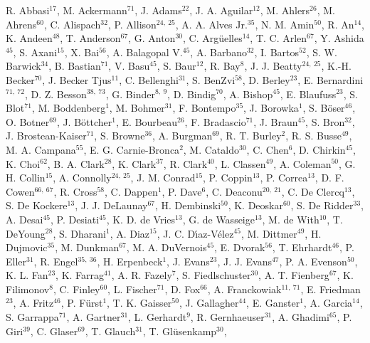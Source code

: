 \documentclass[a4paper,11pt]{article}
\begin{document}
\scriptsize
\noindent
R. Abbasi$^{17}$,
M. Ackermann$^{71}$,
J. Adams$^{22}$,
J. A. Aguilar$^{12}$,
M. Ahlers$^{26}$,
M. Ahrens$^{60}$,
C. Alispach$^{32}$,
P. Allison$^{24,\: 25}$,
A. A. Alves Jr.$^{35}$,
N. M. Amin$^{50}$,
R. An$^{14}$,
K. Andeen$^{48}$,
T. Anderson$^{67}$,
G. Anton$^{30}$,
C. Arg{\"u}elles$^{14}$,
T. C. Arlen$^{67}$,
Y. Ashida$^{45}$,
S. Axani$^{15}$,
X. Bai$^{56}$,
A. Balagopal V.$^{45}$,
A. Barbano$^{32}$,
I. Bartos$^{52}$,
S. W. Barwick$^{34}$,
B. Bastian$^{71}$,
V. Basu$^{45}$,
S. Baur$^{12}$,
R. Bay$^{8}$,
J. J. Beatty$^{24,\: 25}$,
K.-H. Becker$^{70}$,
J. Becker Tjus$^{11}$,
C. Bellenghi$^{31}$,
S. BenZvi$^{58}$,
D. Berley$^{23}$,
E. Bernardini$^{71,\: 72}$,
D. Z. Besson$^{38,\: 73}$,
G. Binder$^{8,\: 9}$,
D. Bindig$^{70}$,
A. Bishop$^{45}$,
E. Blaufuss$^{23}$,
S. Blot$^{71}$,
M. Boddenberg$^{1}$,
M. Bohmer$^{31}$,
F. Bontempo$^{35}$,
J. Borowka$^{1}$,
S. B{\"o}ser$^{46}$,
O. Botner$^{69}$,
J. B{\"o}ttcher$^{1}$,
E. Bourbeau$^{26}$,
F. Bradascio$^{71}$,
J. Braun$^{45}$,
S. Bron$^{32}$,
J. Brostean-Kaiser$^{71}$,
S. Browne$^{36}$,
A. Burgman$^{69}$,
R. T. Burley$^{2}$,
R. S. Busse$^{49}$,
M. A. Campana$^{55}$,
E. G. Carnie-Bronca$^{2}$,
M. Cataldo$^{30}$,
C. Chen$^{6}$,
D. Chirkin$^{45}$,
K. Choi$^{62}$,
B. A. Clark$^{28}$,
K. Clark$^{37}$,
R. Clark$^{40}$,
L. Classen$^{49}$,
A. Coleman$^{50}$,
G. H. Collin$^{15}$,
A. Connolly$^{24,\: 25}$,
J. M. Conrad$^{15}$,
P. Coppin$^{13}$,
P. Correa$^{13}$,
D. F. Cowen$^{66,\: 67}$,
R. Cross$^{58}$,
C. Dappen$^{1}$,
P. Dave$^{6}$,
C. Deaconu$^{20,\: 21}$,
C. De Clercq$^{13}$,
S. De Kockere$^{13}$,
J. J. DeLaunay$^{67}$,
H. Dembinski$^{50}$,
K. Deoskar$^{60}$,
S. De Ridder$^{33}$,
A. Desai$^{45}$,
P. Desiati$^{45}$,
K. D. de Vries$^{13}$,
G. de Wasseige$^{13}$,
M. de With$^{10}$,
T. DeYoung$^{28}$,
S. Dharani$^{1}$,
A. Diaz$^{15}$,
J. C. D{\'\i}az-V{\'e}lez$^{45}$,
M. Dittmer$^{49}$,
H. Dujmovic$^{35}$,
M. Dunkman$^{67}$,
M. A. DuVernois$^{45}$,
E. Dvorak$^{56}$,
T. Ehrhardt$^{46}$,
P. Eller$^{31}$,
R. Engel$^{35,\: 36}$,
H. Erpenbeck$^{1}$,
J. Evans$^{23}$,
J. J. Evans$^{47}$,
P. A. Evenson$^{50}$,
K. L. Fan$^{23}$,
K. Farrag$^{41}$,
A. R. Fazely$^{7}$,
S. Fiedlschuster$^{30}$,
A. T. Fienberg$^{67}$,
K. Filimonov$^{8}$,
C. Finley$^{60}$,
L. Fischer$^{71}$,
D. Fox$^{66}$,
A. Franckowiak$^{11,\: 71}$,
E. Friedman$^{23}$,
A. Fritz$^{46}$,
P. F{\"u}rst$^{1}$,
T. K. Gaisser$^{50}$,
J. Gallagher$^{44}$,
E. Ganster$^{1}$,
A. Garcia$^{14}$,
S. Garrappa$^{71}$,
A. Gartner$^{31}$,
L. Gerhardt$^{9}$,
R. Gernhaeuser$^{31}$,
A. Ghadimi$^{65}$,
P. Giri$^{39}$,
C. Glaser$^{69}$,
T. Glauch$^{31}$,
T. Gl{\"u}senkamp$^{30}$,
\end{document}

